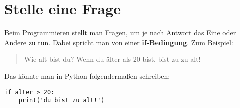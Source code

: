 

\chapter{Stelle eine Frage}\label{ch:howtoaskaquestion}

Beim Programmieren stellt man Fragen, um je nach Antwort das Eine oder Andere zu tun. Dabei spricht man von einer \textbf{if-Bedingung}. Zum Beispiel:

\begin{quotation}
Wie alt bist du? Wenn du älter als 20 bist, bist zu zu alt!
\end{quotation}

Das könnte man in Python folgendermaßen schreiben:

\begin{Verbatim}[frame=single]
if alter > 20:
    print('du bist zu alt!')
\end{Verbatim}

